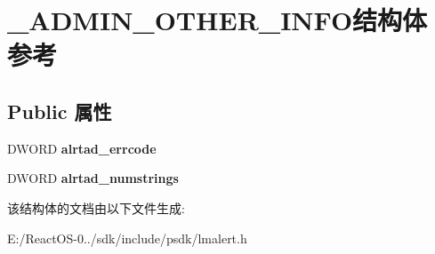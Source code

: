 \hypertarget{struct___a_d_m_i_n___o_t_h_e_r___i_n_f_o}{}\section{\+\_\+\+A\+D\+M\+I\+N\+\_\+\+O\+T\+H\+E\+R\+\_\+\+I\+N\+F\+O结构体 参考}
\label{struct___a_d_m_i_n___o_t_h_e_r___i_n_f_o}
\subsection*{Public 属性}
\begin{DoxyCompactItemize}
\item 
\mbox{\label{struct___a_d_m_i_n___o_t_h_e_r___i_n_f_o_a002860c79e7aa25e6631f7b1a87da7ab}} 
D\+W\+O\+RD {\bfseries alrtad\+\_\+errcode}
\item 
\mbox{\label{struct___a_d_m_i_n___o_t_h_e_r___i_n_f_o_a14ab5c43ce12193d3c2e3525e4372586}} 
D\+W\+O\+RD {\bfseries alrtad\+\_\+numstrings}
\end{DoxyCompactItemize}


该结构体的文档由以下文件生成\+:\begin{DoxyCompactItemize}
\item 
E\+:/\+React\+O\+S-\/0../sdk/include/psdk/lmalert.\+h\end{DoxyCompactItemize}
